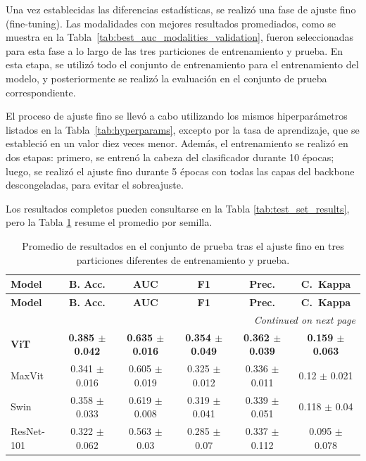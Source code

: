 \documentclass[a4paper,10pt]{book}
\begin{document}
Una vez establecidas las diferencias estadísticas, se realizó una fase de ajuste fino (fine-tuning). Las modalidades con mejores resultados promediados, como se muestra en la Tabla~\ref{tab:best_auc_modalities_validation}, fueron seleccionadas para esta fase a lo largo de las tres particiones de entrenamiento y prueba. En esta etapa, se utilizó todo el conjunto de entrenamiento para el entrenamiento del modelo, y posteriormente se realizó la evaluación en el conjunto de prueba correspondiente.

El proceso de ajuste fino se llevó a cabo utilizando los mismos hiperparámetros listados en la Tabla~\ref{tab:hyperparams}, excepto por la tasa de aprendizaje, que se estableció en un valor diez veces menor. Además, el entrenamiento se realizó en dos etapas: primero, se entrenó la cabeza del clasificador durante 10 épocas; luego, se realizó el ajuste fino durante 5 épocas con todas las capas del backbone descongeladas, para evitar el sobreajuste.

Los resultados completos pueden consultarse en la Tabla \ref{tab:test_set_results}, pero la Tabla \ref{tab:test_set_results_avg} resume el promedio por semilla.

\begin{scriptsize}
\begin{longtable}{@{}l c c c c c@{}}
\caption[Resultados promedios en el conjunto de prueba]{Promedio de resultados en el conjunto de prueba tras el ajuste fino en tres particiones diferentes de entrenamiento y prueba.}
\label{tab:test_set_results_avg} \\
\toprule
\textbf{Model} & \textbf{B. Acc.} & \textbf{AUC} & \textbf{F1} & \textbf{Prec.}  & \textbf{C.\ Kappa}\\
\midrule
\endfirsthead

\toprule
\textbf{Model} & \textbf{B. Acc.} & \textbf{AUC} & \textbf{F1} & \textbf{Prec.} & \textbf{C.\ Kappa}\\
\midrule
\endhead

\midrule
\multicolumn{6}{r}{\textit{Continued on next page}}\\
\midrule
\endfoot

\bottomrule
\endlastfoot
     \textbf{ViT} & \textbf{0.385 $\pm$ 0.042} & \textbf{0.635  $\pm$ 0.016} & \textbf{0.354  $\pm$ 0.049} & \textbf{0.362  $\pm$ 0.039} & \textbf{0.159  $\pm$ 0.063}  \\
     MaxVit & 0.341 $\pm$ 0.016 & 0.605 $\pm$  0.019 & 0.325 $\pm$  0.012 & 0.336 $\pm$  0.011 & 0.12 $\pm$  0.021 \\
    Swin & 0.358 $\pm$  0.033 & 0.619 $\pm$  0.008 & 0.319 $\pm$  0.041 & 0.339 $\pm$  0.051 & 0.118 $\pm$  0.04 \\
    ResNet-101 & 0.322 $\pm$  0.062 & 0.563 $\pm$  0.03 & 0.285 $\pm$  0.07 & 0.337 $\pm$  0.112 & 0.095 $\pm$  0.078 \\
\end{longtable}
\end{scriptsize}
\end{document}
